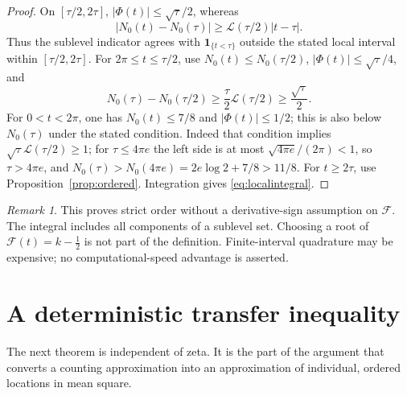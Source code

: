 \documentclass[11pt]{article}
\numberwithin{equation}{section}
\theoremstyle{remark}
\newtheorem{remark}[theorem]{Remark}
\newcommand{\NO}{N_0}
\newcommand{\LL}{\mathcal L}
\newcommand{\Fc}{\mathscr F}
\newcommand{\Ind}{\mathbf 1}
\begin{document}
\begin{proof}
On \([\tau/2,2\tau]\), \(|\Phi(t)|\le\sqrt{\tau}/2\), whereas
\[
 |\NO(t)-\NO(\tau)|\ge
       \LL(\tau/2)|t-\tau|.
\]
Thus the sublevel indicator agrees with \(\Ind_{\{t<\tau\}}\) outside
the stated local interval within \([\tau/2,2\tau]\).
For \(2\pi\le t\le\tau/2\), use
\(\NO(t)\le\NO(\tau/2)\), \(|\Phi(t)|\le\sqrt{\tau}/4\), and
\[
 \NO(\tau)-\NO(\tau/2)
 \ge\frac{\tau}{2}\LL(\tau/2)\ge\frac{\sqrt{\tau}}2 .
\]
For \(0<t<2\pi\), one has \(\NO(t)\le7/8\) and
\(|\Phi(t)|\le1/2\); this is also below \(\NO(\tau)\) under the
stated condition. Indeed that condition implies
\(\sqrt{\tau}\LL(\tau/2)\ge1\); for \(\tau\le4\pi e\) the left side
is at most \(\sqrt{4\pi e}/(2\pi)<1\), so \(\tau>4\pi e\), and
\(\NO(\tau)>\NO(4\pi e)=2e\log 2+7/8>11/8\).
For \(t\ge2\tau\), use Proposition~\ref{prop:ordered}.
Integration gives \eqref{eq:localintegral}.
\end{proof}
\begin{remark}
This proves strict order without a derivative-sign assumption on \(\Fc\).
The integral includes all components of a sublevel set. Choosing a root
of \(\Fc(t)=k-\tfrac12\) is not part of the definition.
Finite-interval quadrature may be expensive; no computational-speed
advantage is asserted.
\end{remark}

\section{A deterministic transfer inequality}
\label{sec:transfer}
The next theorem is independent of zeta. It is the part of the argument
that converts a counting approximation into an approximation of
individual, ordered locations in mean square.
\end{document}

